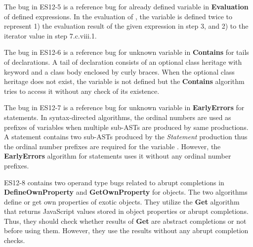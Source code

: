 The bug in ES12-5 is a reference bug for already defined variable 
in \textbf{Evaluation} of defined  expressions.  In the evaluation
of , the variable  is defined twice to
represent 1) the evaluation result of the given expression  in step
3, and 2) to the iterator value in step 7.c.viii.1.

The bug in ES12-6 is a reference bug for unknown variable 
in \textbf{Contains} for tails of  declarations.  A tail of
 declaration consists of an optional class heritage with
 keyword and a class body enclosed by curly braces.  When the
optional class heritage does not exist, the variable  is not
defined but the \textbf{Contains} algorithm tries to access it without any check
of its existence.

The bug in ES12-7 is a reference bug for unknown variable  in
\textbf{EarlyErrors} for  statements.  In syntax-directed algorithms,
the ordinal numbers are used as prefixes of variables when multiple sub-ASTs are
produced by same productions.  A  statement contains two sub-ASTs
produced by the \textit{Statement} production thus the ordinal number prefixes
are required for the variable .  However, the
\textbf{EarlyErrors} algorithm for  statements uses it without any
ordinal number prefixes.

ES12-8 contains two operand type bugs related to abrupt completions in
\textbf{DefineOwnProperty} and \textbf{GetOwnProperty} for 
objects.  The two algorithms define or get own properties of 
exotic objects.  They utilize the \textbf{Get} algorithm that returns JavaScript
values stored in object properties or abrupt completions.  Thus, they should
check whether results of \textbf{Get} are abstract completions or not before
using them.  However, they use the results without any abrupt completion checks.
